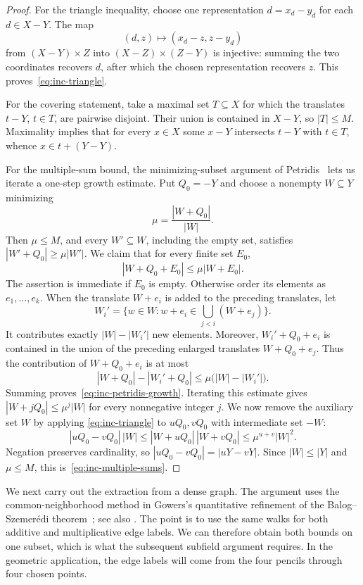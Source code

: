 \begin{proof}
For the triangle inequality, choose one representation $d=x_d-y_d$
for each $d\in X-Y$. The map
\[
 (d,z)\longmapsto (x_d-z,z-y_d)
\]
from $(X-Y)\times Z$ into $(X-Z)\times(Z-Y)$ is injective: summing the
two coordinates recovers $d$, after which the chosen representation
recovers $z$. This proves~\eqref{eq:inc-triangle}.

For the covering statement, take a maximal set $T\subseteq X$ for
which the translates $t-Y$, $t\in T$, are pairwise disjoint. Their union
is contained in $X-Y$, so $|T|\le M$. Maximality implies that for every
$x\in X$ some $x-Y$ intersects $t-Y$ with $t\in T$, whence
$x\in t+(Y-Y)$.

For the multiple-sum bound, the minimizing-subset argument of
Petridis~\cite{Petridis2012} lets us iterate a one-step growth estimate.
Put $Q_0=-Y$ and choose a nonempty
$W\subseteq Y$ minimizing
\[
 \mu=\frac{|W+Q_0|}{|W|}.
\]
Then $\mu\le M$, and every $W'\subseteq W$, including the empty set,
satisfies $|W'+Q_0|\ge\mu|W'|$. We claim that for every finite set $E_0$,
\begin{equation}\label{eq:inc-petridis-growth}
 |W+Q_0+E_0|\le\mu|W+E_0|.
\end{equation}
The assertion is immediate if $E_0$ is empty. Otherwise order its
elements as $e_1,\ldots,e_k$. When the translate $W+e_i$ is added to
the preceding translates, let
\[
 W_i'=\{w\in W:w+e_i\in\bigcup_{j<i}(W+e_j)\}.
\]
It contributes exactly $|W|-|W_i'|$ new elements. Moreover,
$W_i'+Q_0+e_i$ is contained in the union of the preceding enlarged
translates $W+Q_0+e_j$. Thus the contribution of $W+Q_0+e_i$ is at most
\[
 |W+Q_0|-|W_i'+Q_0|
 \le\mu\bigl(|W|-|W_i'|\bigr).
\]
Summing proves~\eqref{eq:inc-petridis-growth}. Iterating this estimate
gives $|W+jQ_0|\le\mu^j|W|$ for every nonnegative integer $j$.
We now remove the auxiliary set $W$ by applying
\eqref{eq:inc-triangle} to $uQ_0,vQ_0$ with intermediate set $-W$:
\[
 |uQ_0-vQ_0|\,|W|
 \le |W+uQ_0|\,|W+vQ_0|
 \le\mu^{u+v}|W|^2.
\]
Negation preserves cardinality, so $|uQ_0-vQ_0|=|uY-vY|$. Since
$|W|\le|Y|$ and $\mu\le M$, this is~\eqref{eq:inc-multiple-sums}.
\end{proof}

We next carry out the extraction from a dense graph. The argument uses
the common-neighborhood method in Gowers's quantitative refinement
\cite[Section 4, Lemma 11 and Proposition 12]{Gowers1998} of the
Balog--Szemer\'edi theorem~\cite{BalogSzemeredi1994}; see also
\cite[Section 5, Lemmas 5.1--5.2]{FoxSudakov2011}. The point is to use the same walks
for both additive and multiplicative edge labels. We can therefore
obtain both bounds on one subset, which is what the subsequent
subfield argument requires. In the geometric application, the edge
labels will come from the four pencils through four chosen points.

